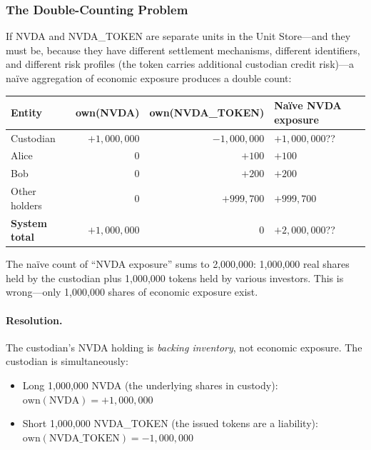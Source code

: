 \documentclass[11pt,a4paper]{article}
\begin{document}
\subsubsection{The Double-Counting Problem}
\label{sec:cdm-tokenized-double-counting}

If NVDA and NVDA\_TOKEN are separate units in the Unit Store---and they must be, because they have different settlement mechanisms, different identifiers, and different risk profiles (the token carries additional custodian credit risk)---a na\"ive aggregation of economic exposure produces a double count:

\begin{center}
\small
\begin{tabular}{@{}lrrl@{}}
\toprule
\textbf{Entity} & \textbf{own(NVDA)} & \textbf{own(NVDA\_TOKEN)} & \textbf{Na\"ive NVDA exposure} \\
\midrule
Custodian & $+1{,}000{,}000$ & $-1{,}000{,}000$ & $+1{,}000{,}000$?? \\
Alice & 0 & $+100$ & $+100$ \\
Bob & 0 & $+200$ & $+200$ \\
Other holders & 0 & $+999{,}700$ & $+999{,}700$ \\
\midrule
\textbf{System total} & $+1{,}000{,}000$ & $0$ & $+2{,}000{,}000$?? \\
\bottomrule
\end{tabular}
\end{center}

\noindent The na\"ive count of ``NVDA exposure'' sums to 2,000,000: 1,000,000 real shares held by the custodian plus 1,000,000 tokens held by various investors. This is wrong---only 1,000,000 shares of economic exposure exist.

\paragraph{Resolution.} The custodian's NVDA holding is \emph{backing inventory}, not economic exposure. The custodian is simultaneously:
\begin{itemize}[nosep]
\item Long 1,000,000 NVDA (the underlying shares in custody): $\text{own}(\text{NVDA}) = +1{,}000{,}000$
\item Short 1,000,000 NVDA\_TOKEN (the issued tokens are a liability): $\text{own}(\text{NVDA\_TOKEN}) = -1{,}000{,}000$
\end{itemize}
\end{document}
